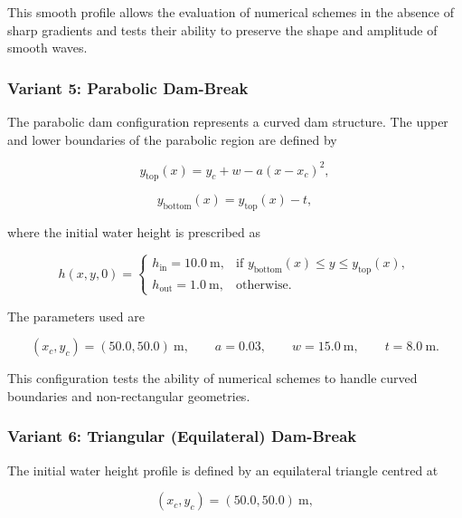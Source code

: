 \documentclass[12pt]{article}
\begin{document}
This smooth profile allows the evaluation of numerical schemes in the absence of sharp gradients and tests their ability to preserve the shape and amplitude of smooth waves.

\subsubsection{Variant 5: Parabolic Dam-Break}

The parabolic dam configuration represents a curved dam structure. The upper and lower boundaries of the parabolic region are defined by

\begin{equation}
y_{\mathrm{top}}(x)
=
y_c+w-a(x-x_c)^2,
\end{equation}

\begin{equation}
y_{\mathrm{bottom}}(x)
=
y_{\mathrm{top}}(x)-t,
\end{equation}

where the initial water height is prescribed as

\begin{equation}
h(x,y,0)=
\begin{cases}
h_{\mathrm{in}}=10.0~\mathrm{m},
& \text{if }
y_{\mathrm{bottom}}(x)
\leq y \leq
y_{\mathrm{top}}(x),\\
h_{\mathrm{out}}=1.0~\mathrm{m},
& \text{otherwise}.
\end{cases}
\end{equation}

The parameters used are

\begin{equation}
(x_c,y_c)=(50.0,50.0)~\mathrm{m},
\qquad
a=0.03,
\qquad
w=15.0~\mathrm{m},
\qquad
t=8.0~\mathrm{m}.
\end{equation}

This configuration tests the ability of numerical schemes to handle curved boundaries and non-rectangular geometries.

\subsubsection{Variant 6: Triangular (Equilateral) Dam-Break}

The initial water height profile is defined by an equilateral triangle centred at

\begin{equation}
(x_c,y_c)=(50.0,50.0)~\mathrm{m},
\end{equation}
\end{document}
